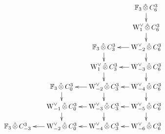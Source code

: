 
\[
	\xymatrix@R=.4cm@C=.4cm{
		\phantom{W_4\hotimes C^{3}_{-3}} &
		\phantom{W_4\hotimes C^{3}_{-3}} &
		\phantom{W_4\hotimes C^{3}_{0}} &
		\phantom{W_4\hotimes C^{3}_{3}} &
		\bF_3\hotimes C^{3}_{6}\ar[d]
		\\
		\phantom{W_3\hotimes C^{3}_{-3}} &
		\phantom{W_3\hotimes C^{3}_{-3}} &
		\phantom{W_3\hotimes C^{3}_{0}} &
		\phantom{W_3\hotimes C^{3}_{3}} &
		\rWd[1]\hotimes C^{3}_{6}\ar[d]
		\\
		\phantom{W_2\hotimes C^{3}_{-3}} &
		\phantom{W_2\hotimes C^{3}_{-3}} &
		\phantom{W_2\hotimes C^{3}_{0}} &
		\bF_3\hotimes C^{3}_{3}\ar[d] &
		\rWd[-2]\hotimes C^{3}_{6}\ar[d]\ar[l]
		\\
		\phantom{W_1\hotimes C^{3}_{-3}} &
		\phantom{W_1\hotimes C^{3}_{-3}}&
		\phantom{W_1\hotimes C^{3}_{0}} &
		\rWd[1]\hotimes C^{3}_{3}\ar[d] &
		\rWd[-3]\hotimes C^{3}_{6}\ar[d]\ar[l]
		\\
		\phantom{W_0\hotimes C^{3}_{-3}} &
		\phantom{W_0\hotimes C^{3}_{-3}}&
		\bF_3\hotimes C^{3}_{0}\ar[d] &
		\rWd[-2]\hotimes C^{3}_{3}\ar[d]\ar[l] &
		\rWd[-4]\hotimes C^{3}_{6}\ar[d]\ar[l]
		\\
		\phantom{\rWd[-1]\hotimes C^{3}_{-3}} &
		\phantom{\rWd[-1]\hotimes C^{3}_{-3}} &
		\rWd[-1]\hotimes C^{3}_{0}\ar[d] &
		\rWd[-3]\hotimes C^{3}_{3}\ar[d]\ar[l] &
		\rWd[-5]\hotimes C^{3}_{6}\ar[d]\ar[l]
		\\
		\phantom{\rWd[-2]\hotimes C^{3}_{-3}} &
		\bF_3\hotimes C^{3}_{-3} &
		\rWd[-2]\hotimes C^{3}_{0}\ar[l] &
		\rWd[-4]\hotimes C^{3}_{3}\ar[l] &
		\rWd[-6]\hotimes C^{3}_{6}\ar[l]
}
\]
